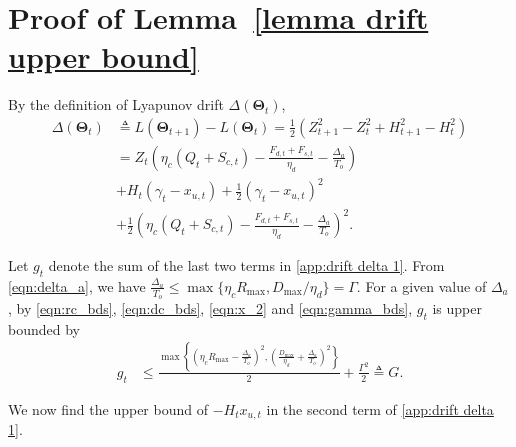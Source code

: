 \documentclass[journal]{IEEEtran}
\def\Thetabf{\boldsymbol \Theta}
\def\nn{\nonumber}
\begin{document}
\section{Proof of Lemma~\ref{lemma drift upper bound}}\label{app drift upper bound}
\IEEEproof
By the definition of Lyapunov drift  $\Delta(\Thetabf_t)$,
\begin{align}\label{app:drift delta 1}
\Delta(\Thetabf_t)
&\triangleq L(\Thetabf_{t+1})-L(\Thetabf_t)=\frac{1}{2}\left(Z^2_{t+1}-Z^2_t+H^2_{t+1}-H^2_t\right)\nn\\
&=Z_t\left(\eta_c(Q_t+S_{c,t})-\frac{F_{d,t}+F_{s,t}}{\eta_d}-\frac{\Delta_a}{T_o}\right)\nn\\
&+H_t(\gamma_t-x_{u,t})+\frac{1}{2}(\gamma_t-x_{u,t})^2\nn\\
&+\frac{1}{2}\left(\eta_c(Q_t+S_{c,t})-\frac{F_{d,t}+F_{s,t}}{\eta_d}-\frac{\Delta_a}{T_o}\right)^2.
\end{align}


Let $g_t$ denote the sum of the last two terms in \eqref{app:drift delta 1}. From \eqref{eqn:delta_a}, we have $\frac{\Delta_a}{T_o}\le \max\{\eta_cR_{\max},D_{\max}/\eta_d\}=\Gamma$. For a given value of $\Delta_a$, by \eqref{eqn:rc_bds}, \eqref{eqn:dc_bds}, \eqref{eqn:x_2} and \eqref{eqn:gamma_bds}, $g_t$ is upper bounded by
\begin{align}\label{eqn:lemma_G}
g_t& \le \frac{\max\left\{\left(\eta_cR_{\max}-\frac{\Delta_a}{T_o}\right)^2,\left(\frac{D_{\max}}{\eta_d}+\frac{\Delta_a}{T_o}\right)^2\right\}}{2}+\frac{\Gamma^2}{2}
\triangleq G.
\end{align}

We now find the upper bound of $-H_tx_{u,t}$ in the second term of \eqref{app:drift delta 1}.
\end{document}
